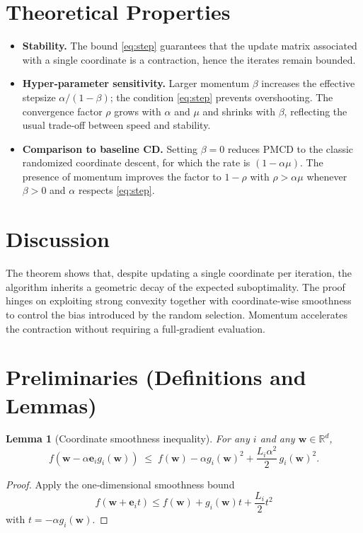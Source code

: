 \documentclass[11pt]{article}
\newtheorem{lemma}{Lemma}
\newcommand{\R}{\mathbb{R}}
\begin{document}
\section*{Theoretical Properties}
\begin{itemize}
\item \textbf{Stability.} The bound \eqref{eq:step} guarantees that the
update matrix associated with a single coordinate is a contraction,
hence the iterates remain bounded.
\item \textbf{Hyper‑parameter sensitivity.} Larger momentum $\beta$
increases the effective stepsize $\alpha/(1-\beta)$; the condition
\eqref{eq:step} prevents overshooting. The convergence factor $\rho$ grows
with $\alpha$ and $\mu$ and shrinks with $\beta$, reflecting the usual
trade‑off between speed and stability.
\item \textbf{Comparison to baseline CD.} Setting $\beta=0$ reduces PMCD to
the classic randomized coordinate descent, for which the rate is
$(1-\alpha\mu)$. The presence of momentum improves the factor to
$1-\rho$ with $\rho>\alpha\mu$ whenever $\beta>0$ and $\alpha$ respects
\eqref{eq:step}.
\end{itemize}

\section*{Discussion}
The theorem shows that, despite updating a single coordinate per
iteration, the algorithm inherits a geometric decay of the expected
suboptimality. The proof hinges on exploiting strong convexity together
with coordinate-wise smoothness to control the bias introduced by the
random selection. Momentum accelerates the contraction without
requiring a full‑gradient evaluation.

\newpage
\section*{Preliminaries (Definitions and Lemmas)}
\begin{lemma}[Coordinate smoothness inequality]\label{lem:smooth}
For any $i$ and any $\mathbf w\in\R^{d}$,
\[
f(\mathbf w-\alpha\mathbf e_i g_i(\mathbf w))
\;\le\;
f(\mathbf w)-\alpha g_i(\mathbf w)^{2}
+\frac{L_i\alpha^{2}}{2}\,g_i(\mathbf w)^{2}.
\tag{9}
\]
\end{lemma}
\begin{proof}
Apply the one‑dimensional smoothness bound
\[
f(\mathbf w+\mathbf e_i t)
\le f(\mathbf w)+g_i(\mathbf w)t+\frac{L_i}{2}t^{2}
\]
with $t=-\alpha g_i(\mathbf w)$.
\end{proof}
\end{document}

